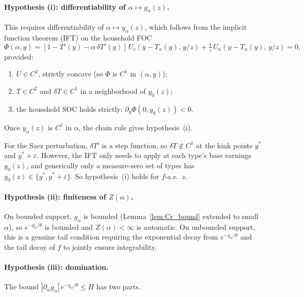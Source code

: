 \documentclass[12pt,a4paper]{article}
\theoremstyle{definition}
\theoremstyle{plain}
\theoremstyle{remark}
\begin{document}
\paragraph{Hypothesis (i): differentiability of
$\alpha \mapsto g_\alpha(z)$.}
This requires differentiability of
$\alpha \mapsto y_\alpha(z)$, which follows from the
implicit function theorem (IFT) on the household FOC
\[
  \Phi(\alpha, y)
  = [1 - T'(y) - \alpha\,\delta T'(y)]\,
  U_c(y - T_\alpha(y),\, y/z)
  + \tfrac{1}{z}\,U_n(y - T_\alpha(y),\, y/z) = 0,
\]
provided:
\begin{enumerate}[label=(P\arabic*)]
\item $U \in C^2$, strictly concave (so $\Phi$ is $C^1$
  in $(\alpha, y)$);
\item $T \in C^2$ and $\delta T \in C^1$ in a
  neighborhood of $y_0(z)$;
\item the household SOC holds strictly:
  $\partial_y \Phi(0, y_0(z)) < 0$.
\end{enumerate}
Once $y_\alpha(z)$ is $C^1$ in $\alpha$, the chain
rule gives hypothesis~(i).

For the Saez perturbation, $\delta T'$ is a step
function, so $\delta T \notin C^1$ at the kink points
$y^*$ and $y^* + \varepsilon$.  However, the IFT only
needs to apply at each type's base earnings $y_0(z)$,
and generically only a measure-zero set of types has
$y_0(z) \in \{y^*, y^* + \varepsilon\}$.  So
hypothesis~(i) holds for $f$-a.e.\ $z$.

\paragraph{Hypothesis (ii): finiteness of $Z(\alpha)$.}
On bounded support, $g_\alpha$ is bounded
(Lemma~\ref{lem:Cr_bound} extended to small $\alpha$),
so $e^{-g_\alpha/\theta}$ is bounded and
$Z(\alpha) < \infty$ is automatic.  On unbounded
support, this is a genuine tail condition requiring the
exponential decay from $e^{-g_\alpha/\theta}$ and the
tail decay of $f$ to jointly ensure integrability.

\paragraph{Hypothesis (iii): domination.}
The bound
$|\partial_\alpha g_\alpha|\,e^{-g_\alpha/\theta}
\leq H$ has two parts.
\end{document}
